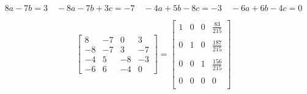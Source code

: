 \[
    8a -7b = 3\quad-8a-7b+3c=-7\quad-4a+5b-8c=-3\quad-6a+6b-4c=0    
\]

\[
    \left[
        \begin{array}{ccc|c}
            8&-7&0&3 \\
            -8&-7&3&-7 \\
            -4&5&-8&-3 \\
            -6&6&-4&0
        \end{array}
    \right] = 
    \left[
        \begin{array}{ccc|c}
            1&0&0&\frac{83}{215} \\
            &&&\\
            0&1&0&\frac{187}{215} \\
            &&&\\
            0&0&1&\frac{156}{215} \\
            &&&\\
            0&0&0&0 \\
            
        \end{array}    
    \right]
\]